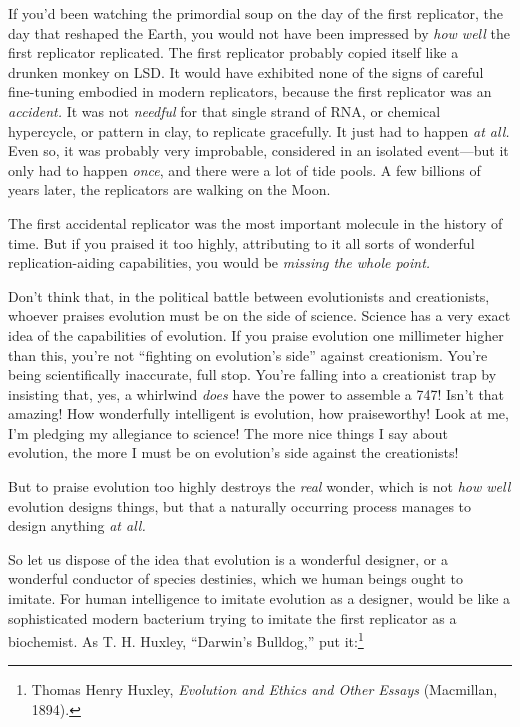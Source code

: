  If you'd been watching the primordial soup on the
day of the first replicator, the day that reshaped the Earth, you would
not have been impressed by \textit{how well} the first replicator
replicated. The first replicator probably copied itself like a drunken
monkey on LSD. It would have exhibited none of the signs of careful
fine-tuning embodied in modern replicators, because the first
replicator was an \textit{accident.} It was not \textit{needful} for
that single strand of RNA, or chemical hypercycle, or pattern in clay,
to replicate gracefully. It just had to happen \textit{at all.} Even
so, it was probably very improbable, considered in an isolated
event---but it only had to happen \textit{once}, and there were a lot
of tide pools. A few billions of years later, the replicators are
walking on the Moon.


 The first accidental replicator was the most important molecule in
the history of time. But if you praised it too highly, attributing to
it all sorts of wonderful replication-aiding capabilities, you would be
\textit{missing the whole point.}


 Don't think that, in the political battle between
evolutionists and creationists, whoever praises evolution must be on
the side of science. Science has a very exact idea of the capabilities
of evolution. If you praise evolution one millimeter higher than this,
you're not ``fighting on
evolution's side'' against
creationism. You're being scientifically inaccurate,
full stop. You're falling into a creationist trap by
insisting that, yes, a whirlwind \textit{does} have the power to
assemble a 747! Isn't that amazing! How wonderfully
intelligent is evolution, how praiseworthy! Look at me,
I'm pledging my allegiance to science! The more nice
things I say about evolution, the more I must be on
evolution's side against the creationists!


 But to praise evolution too highly destroys the \textit{real}
wonder, which is not \textit{how well} evolution designs things, but
that a naturally occurring process manages to design anything
\textit{at all.}

{
 So let us dispose of the idea that evolution is a wonderful
designer, or a wonderful conductor of species destinies, which we human
beings ought to imitate. For human intelligence to imitate evolution as
a designer, would be like a sophisticated modern bacterium trying to
imitate the first replicator as a biochemist. As T. H. Huxley,
``Darwin's
Bulldog,'' put it:\footnote{Thomas Henry Huxley, \textit{Evolution and Ethics and Other
Essays} (Macmillan, 1894).}}

